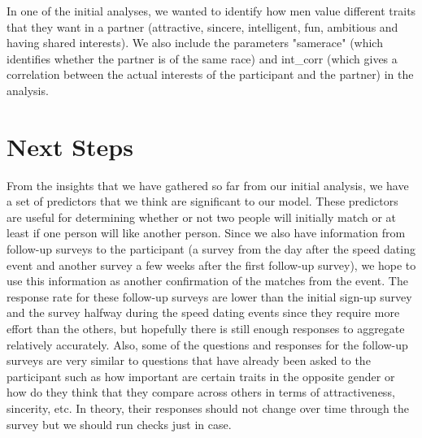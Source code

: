 \documentclass{article}
\begin{document}
In one of the initial analyses, we wanted to identify how men value different traits that they want in a partner (attractive, sincere, intelligent, fun, ambitious and having shared interests). We also include the parameters "samerace" (which identifies whether the partner is of the same race) and int\_corr (which gives a correlation between the actual interests of the participant and the partner) in the analysis. 

 
 

\section{Next Steps}
From the insights that we have gathered so far from our initial analysis, we have a set of predictors that we think are significant to our model.  These predictors are useful for determining whether or not two people will initially match or at least if one person will like another person.  Since we also have information from follow-up surveys to the participant (a survey from the day after the speed dating event and another survey a few weeks after the first follow-up survey), we hope to use this information as another confirmation of the matches from the event.  The response rate for these follow-up surveys are lower than the initial sign-up survey and the survey halfway during the speed dating events since they require more effort than the others, but hopefully there is still enough responses to aggregate relatively accurately.  Also, some of the questions and responses for the follow-up surveys are very similar to questions that have already been asked to the participant such as how important are certain traits in the opposite gender or how do they think that they compare across others in terms of attractiveness, sincerity, etc.  In theory, their responses should not change over time through the survey but we should run checks just in case.\\
\end{document}
